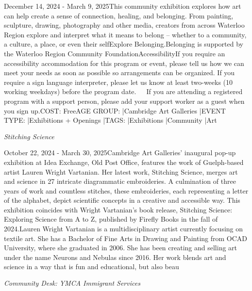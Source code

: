 \documentclass[letterpaper, 10pt]{article}
\newcommand{\subtitle}[1]{\textit{\large #1}\vspace{0.5em}}
\newcommand{\articlecontent}[1]{\small #1\vspace{1em}}
\begin{document}
\begin{multicols}{2}
{December 14, 2024 - March 9, 2025This community exhibition explores how art can help create a sense of connection, healing, and belonging. From painting, sculpture, drawing, photography and other media, creators from across Waterloo Region explore and interpret what it means to belong – whether to a community, a culture, a place, or even their selfExplore Belonging.Belonging is supported by the Waterloo Region Community FoundationAccessibilityIf you require an accessibility accommodation for this program or event, please tell us how we can meet your needs as soon as possible so arrangements can be organized. If you require a sign language interpreter, please let us know at least two-weeks (10 working weekdays) before the program date.   If you are attending a registered program with a support person, please add your support worker as a guest when you sign up.COST: FreeAGE GROUP: |Cambridge Art Galleries |EVENT TYPE: |Exhibitions + Openings |TAGS: |Exhibitions |Community |Art
}
\vspace{10px}

\subtitle{Stitching Science}

\articlecontent{

\qrcode[height=1.5cm]{https://ideaexchange.libnet.info/event/12111037}
\vspace{10px}

October 22, 2024 - March 30, 2025Cambridge Art Galleries' inaugural pop-up exhibition at Idea Exchange, Old Post Office, features the work of Guelph-based artist Lauren Wright Vartanian. Her latest work, Stitching Science, merges art and science in 27 intricate diagrammatic embroideries. A culmination of three years of work and countless stitches, these embroideries, each representing a letter of the alphabet, depict scientific concepts in a creative and accessible way. This exhibition coincides with Wright Vartanian’s book release, Stitching Science: Exploring Science from A to Z, published by Firefly Books in the fall of 2024.Lauren Wright Vartanian is a multidisciplinary artist currently focusing on textile art. She has a Bachelor of Fine Arts in Drawing and Painting from OCAD University, where she graduated in 2006. She has been creating and selling art under the name Neurons and Nebulas since 2016. Her work blends art and science in a way that is fun and educational, but also beau
}
\vspace{10px}

\subtitle{Community Desk: YMCA Immigrant Services}

\articlecontent{

}
\end{multicols}
\end{document}
